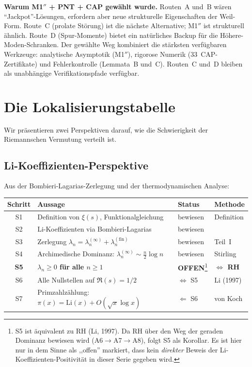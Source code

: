 \documentclass[12pt,a4paper]{article}
\theoremstyle{definition}
\theoremstyle{remark}
\begin{document}
\noindent\textbf{Warum M1$''$ + PNT + CAP gewählt wurde.} Routen~A und~B wären ``Jackpot''-Lösungen, erfordern aber neue strukturelle Eigenschaften der Weil-Form. Route~C (prolate Störung) ist die nächste Alternative; M1$''$ ist strukturell ähnlich. Route~D (Spur-Momente) bietet ein natürliches Backup für die Höhere-Moden-Schranken. Der gewählte Weg kombiniert die stärksten verfügbaren Werkzeuge: analytische Asymptotik (M1$''$), rigorose Numerik (33~CAP-Zertifikate) und Fehlerkontrolle (Lemmata~B und~C). Routen~C und~D bleiben als unabhängige Verifikationspfade verfügbar.


\section{Die Lokalisierungstabelle}
\label{sec:localization}

Wir präsentieren zwei Perspektiven darauf, wie die Schwierigkeit der Riemannschen Vermutung verteilt ist.

\subsection{Li-Koeffizienten-Perspektive}

Aus der Bombieri-Lagarias-Zerlegung und der thermodynamischen Analyse:

\begin{center}
\renewcommand{\arraystretch}{1.2}
\begin{tabular}{c|l|l|l}
\textbf{Schritt} & \textbf{Aussage} & \textbf{Status} & \textbf{Methode} \\\hline
S1 & Definition von $\xi(s)$, Funktionalgleichung & bewiesen & Definition \\
S2 & Li-Koeffizienten via Bombieri-Lagarias & bewiesen & \cite{BombieriLagarias1999} \\
S3 & Zerlegung $\lambda_n = \lambda_n^{(\infty)} + \lambda_n^{(\mathrm{fin})}$ & bewiesen & Teil~I \\
S4 & Archimedische Dominanz: $\lambda_n^{(\infty)} \sim \frac{n}{2}\log n$ & bewiesen & Stirling \\
\textbf{S5} & \textbf{$\lambda_n \geq 0$ für alle $n \geq 1$} & \textbf{OFFEN}\footnote{S5 ist äquivalent zu RH (Li, 1997). Da RH über den Weg der geraden Dominanz bewiesen wird (A6$\to$A7$\to$A8), folgt S5 als Korollar. Es ist hier nur in dem Sinne als ,,offen'' markiert, dass kein \emph{direkter} Beweis der Li-Koeffizienten-Positivität in dieser Serie gegeben wird.} & \textbf{$\Longleftrightarrow$ RH} \\
S6 & Alle Nullstellen auf $\Re(s) = 1/2$ & $\Leftrightarrow$ S5 & Li (1997) \\
S7 & Primzahlzählung: $\pi(x) = \mathrm{Li}(x) + O(\sqrt{x}\log x)$ & $\Leftarrow$ S6 & von Koch
\end{tabular}
\end{center}
\end{document}
